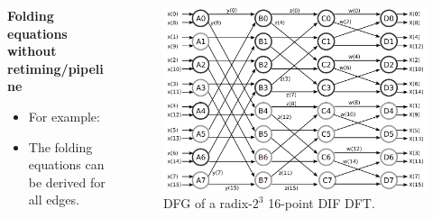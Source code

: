 \begin{frame}
\begin{columns}[t,onlytextwidth]
\begin{column}{0.45\linewidth}
\begin{block}{\centering \textbf{Folding equations without retiming/pipeline}}
\begin{itemize}
					\item For example: \vfill
					\item The folding equations can be derived for all edges. \vfill
	      		\end{itemize}
			\end{block}	      
	      \end{column}
	      \begin{column}{0.50\linewidth}
	      	      \vspace{1cm}
			    \begin{figure}[h!] \centering
	    			\includegraphics[width=0.45\paperwidth]{./image/16points_dfg.png}
	    			\caption{\footnotesize DFG of a radix-$2^3$ 16-point DIF DFT.}
	    		\end{figure}    
	      \end{column}
	    \end{columns}
\end{frame}




